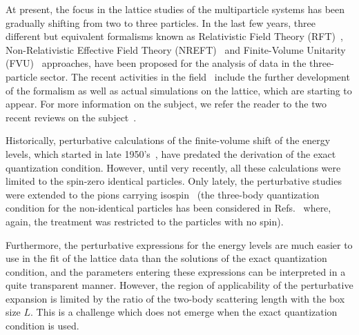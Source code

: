 \documentclass[12pt,prd,tightenlines,nofootinbib]{revtex4-2}
\begin{document}
At present, the focus in the lattice studies of the multiparticle systems has been gradually
shifting from two to three particles. In the last few years, three different but equivalent
formalisms known as Relativistic Field Theory (RFT)~\cite{Hansen:2014eka, Hansen:2015zga},
Non-Relativistic Effective Field Theory (NREFT)~\cite{Hammer:2017uqm, Hammer:2017kms} and
Finite-Volume Unitarity (FVU)~\cite{Mai:2017bge,Mai:2018djl} approaches, have been proposed for the analysis of
data in the three-particle sector. The recent activities in the field~\cite{Kreuzer:2008bi,Kreuzer:2009jp,Kreuzer:2010ti,Kreuzer:2012sr,Briceno:2012rv,Polejaeva:2012ut,Jansen:2015lha,Hansen:2014eka,Hansen:2015zta,Hansen:2015zga,Hansen:2016fzj,Guo:2016fgl,Sharpe:2017jej,Guo:2017crd,Guo:2017ism,Meng:2017jgx,Briceno:2017tce,Hammer:2017uqm,Hammer:2017kms,Mai:2017bge,Guo:2018ibd,Guo:2018xbv,Klos:2018sen,Briceno:2018mlh,Briceno:2018aml,Mai:2019fba,Guo:2019ogp,Guo:2020spn,Blanton:2019igq,Pang:2019dfe,Jackura:2019bmu,Briceno:2019muc,Romero-Lopez:2019qrt,Konig:2020lzo,Brett:2021wyd,Hansen:2020zhy,Blanton:2020gha,Blanton:2020jnm,Pang:2020pkl,Hansen:2020otl,Romero-Lopez:2020rdq,Blanton:2020gmf,Muller:2020vtt,Blanton:2021mih,Muller:2021uur,Beane:2007es,Detmold:2008fn,Detmold:2008yn,Blanton:2019vdk,Horz:2019rrn,Culver:2019vvu,Fischer:2020jzp,Alexandru:2020xqf,Romero-Lopez:2018rcb,Blanton:2021llb,Mai:2021nul,Mai:2018djl,Muller:2022oyw,Blanton:2021eyf,Severt:2022jtg,Baeza-Ballesteros:2023ljl,Draper:2023xvu} include the further development of the formalism as well as actual simulations on the lattice, which are starting to appear.
For more information
on the subject, we refer the reader to the two recent reviews on the
subject~\cite{Hansen:2019nir,Mai:2021lwb}.

Historically, perturbative calculations of the finite-volume shift of the energy levels,
which started in late 1950's~\cite{Huang:1957im,Wu:1959zz,Tan:2007bg,Beane:2007qr,Hansen:2015zta,Hansen:2016fzj,Detmold:2008gh,Muller:2020vtt,Romero-Lopez:2020rdq,Pang:2019dfe}, have predated the derivation of the
exact quantization condition. However, until very recently, all these calculations
were limited to the spin-zero identical particles. Only lately, the perturbative studies were extended to the pions carrying isospin~\cite{Muller:2020vtt}
(the three-body quantization condition for the non-identical particles has been considered
in Refs.~\cite{Blanton:2021eyf,Blanton:2021mih,Blanton:2020gmf}
where, again, the treatment was
restricted to the particles with no spin).

Furthermore, the perturbative expressions for the energy
levels are much easier to use in the fit of the lattice data than the solutions of
the exact quantization condition, and the parameters entering
these expressions can be interpreted in a quite transparent manner. However, the region
of applicability of the perturbative expansion is limited by the ratio of the two-body
scattering length with the box size $L$. This is a
challenge which does not emerge when the exact quantization condition is used.
\end{document}
